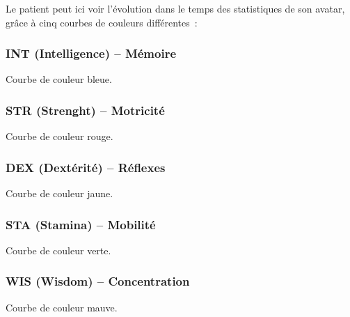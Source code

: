 \documentclass[a4paper,12pt,francais]{article}
\begin{document}
Le patient peut ici voir l'évolution dans le temps des statistiques de son avatar, grâce à cinq courbes de couleurs différentes~:

\subsubsection{INT (Intelligence) – Mémoire}
Courbe de couleur bleue.

\subsubsection{STR (Strenght) – Motricité}
Courbe de couleur rouge.

\subsubsection{DEX (Dextérité) – Réflexes}
Courbe de couleur jaune.

\subsubsection{STA (Stamina) – Mobilité}
Courbe de couleur verte.

\subsubsection{WIS (Wisdom) – Concentration}
Courbe de couleur mauve.


\end{document}
